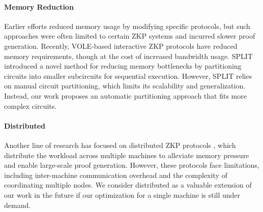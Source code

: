 \paragraph{Memory Reduction}  
Earlier efforts \cite{bootle2022gemini} reduced memory usage by modifying specific protocols, but such approaches were often limited to certain ZKP systems and incurred slower proof generation. Recently, VOLE-based interactive ZKP protocols \cite{baum2021mac, dittmer2020line, weng2021wolverine} have reduced memory requirements, though at the cost of increased bandwidth usage. SPLIT \cite{qi2023split} introduced a novel method for reducing memory bottlenecks by partitioning circuits into smaller subcircuits for sequential execution. However, SPLIT relies on manual circuit partitioning, which limits its scalability and generalization. Instead, our work proposes an automatic partitioning approach that fits more complex circuits. 


\paragraph{Distributed \zk}  
Another line of research has focused on distributed ZKP protocols \cite{wu2018dizk, liu2024pianist, xie2022zkbridge, sang2023automating}, which distribute the workload across multiple machines to alleviate memory pressure and enable large-scale proof generation. However, these protocols face limitations, including inter-machine communication overhead and the complexity of coordinating multiple nodes. 
We consider distributed \zk as a valuable extension of our work in the future if our optimization for a single machine is still under demand. 



